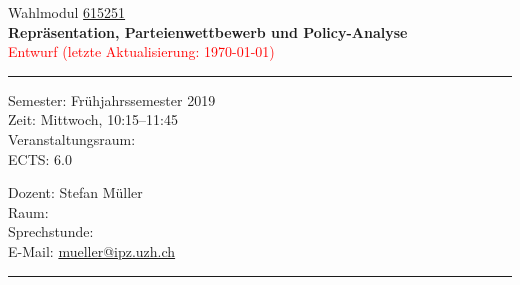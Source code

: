 \documentclass[abstract=on,parskip=full,headings=standardclasses,fontsize=11pt,paper=a4]{scrartcl}
\begin{document}
	
\singlespacing

\noindent
{}%
\hfill%

\singlespacing
\vspace{1cm}

\begin{center}
{\large Wahlmodul \href{https://studentservices.uzh.ch/uzh/anonym/vvz/index.html#/details/2018/004/E/50926420}{615251}} \\ 
\medskip
{\Large \textbf{Repräsentation, Parteienwettbewerb und Policy-Analyse}} \\
\bigskip
{\large  \textcolor{red}{Entwurf (letzte Aktualisierung: \today)}}
\end{center}

\vspace{1.5cm}

\hrule
\medskip
\begin{minipage}[t]{0.5\textwidth}
Semester: Frühjahrssemester 2019 \\
Zeit: Mittwoch, 10:15--11:45 \\
Veranstaltungsraum: \\
ECTS: 6.0
\end{minipage}
\begin{minipage}[t]{0.5\textwidth}
\begin{flushright}
Dozent: Stefan Müller \\
Raum: \\
Sprechstunde: \\
E-Mail: \textsf{\href{mailto:mueller@ipz.uzh.ch}{mueller@ipz.uzh.ch}}
\end{flushright}
\end{minipage}
\medskip
\vspace{2.5mm}
\hrule 
\end{document}
